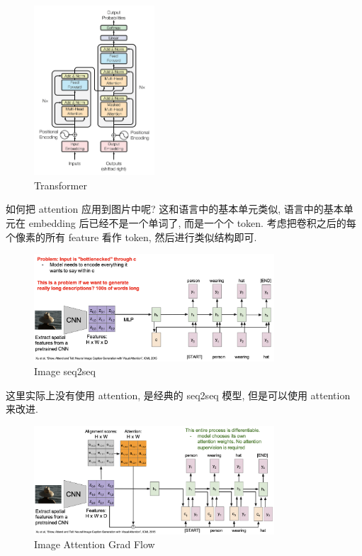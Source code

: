 \begin{figure}[H]
    \centering
    \includegraphics[width=0.4\textwidth]{figures/Transformer.png}
    \caption{Transformer}
    \label{fig:Transformer}
\end{figure}

如何把 attention 应用到图片中呢? 这和语言中的基本单元类似, 语言中的基本单元在 embedding 后已经不是一个单词了, 而是一个个 token.
考虑把卷积之后的每个像素的所有 feature 看作 token, 然后进行类似结构即可.

\begin{figure}[H]
    \centering
    \includegraphics[width=0.8\textwidth]{figures/image_seq2seq.png}
    \caption{Image seq2seq}
    \label{fig:image_seq2seq}
\end{figure}

这里实际上没有使用 attention, 是经典的 seq2seq 模型, 但是可以使用 attention 来改进.

\begin{figure}[H]
    \centering
    \includegraphics[width=0.8\textwidth]{figures/image_attentoin.png}
    \caption{Image Attention Grad Flow}
    \label{fig:image_attentoin}
\end{figure}

